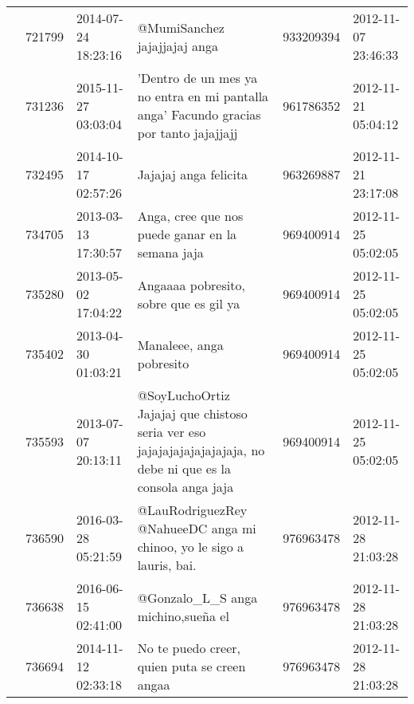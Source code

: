 \begin{tabular}{llllrl}
           & 721799  & 2014-07-24 18:23:16 &                                                                                                                 @MumiSanchez jajajjajaj anga &   933209394 & 2012-11-07 23:46:33 \\
           & 731236  & 2015-11-27 03:03:04 &                                                       'Dentro de un mes ya no entra en mi pantalla anga' Facundo gracias por tanto jajajjajj &   961786352 & 2012-11-21 05:04:12 \\
           & 732495  & 2014-10-17 02:57:26 &                                                                                                                        Jajajaj anga felicita &   963269887 & 2012-11-21 23:17:08 \\
           & 734705  & 2013-03-13 17:30:57 &                                                                                             Anga, cree que nos puede ganar en la semana jaja &   969400914 & 2012-11-25 05:02:05 \\
           & 735280  & 2013-05-02 17:04:22 &                                                                                                       Angaaaa pobresito, sobre que es gil ya &   969400914 & 2012-11-25 05:02:05 \\
           & 735402  & 2013-04-30 01:03:21 &                                                                                                                     Manaleee, anga pobresito &   969400914 & 2012-11-25 05:02:05 \\
           & 735593  & 2013-07-07 20:13:11 &                               @SoyLuchoOrtiz Jajajaj que chistoso seria ver eso jajajajajajajajajaja, no debe ni que es la consola anga jaja &   969400914 & 2012-11-25 05:02:05 \\
           & 736590  & 2016-03-28 05:21:59 &                                                                         @LauRodriguezRey @NahueeDC anga mi chinoo, yo le sigo a lauris, bai. &   976963478 & 2012-11-28 21:03:28 \\
           & 736638  & 2016-06-15 02:41:00 &                                                                                                           @Gonzalo\_L\_S anga michino,sueña el &   976963478 & 2012-11-28 21:03:28 \\
           & 736694  & 2014-11-12 02:33:18 &                                                                                                 No te puedo creer, quien puta se creen angaa &   976963478 & 2012-11-28 21:03:28 \\

\end{tabular}
